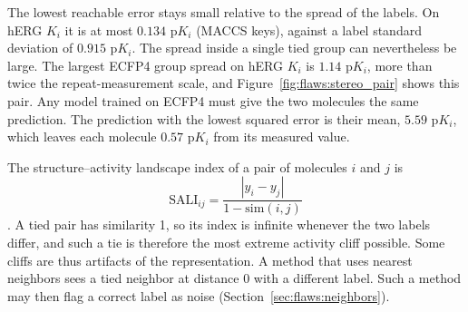 The lowest reachable error stays small relative to the spread of the labels. On hERG $K_i$ it is at most $0.134$ p$K_i$ (MACCS keys), against a label standard deviation of $0.915$ p$K_i$. The spread inside a single tied group can nevertheless be large. The largest ECFP4 group spread on hERG $K_i$ is $1.14$ p$K_i$, more than twice the repeat-measurement scale, and Figure~\ref{fig:flaws:stereo_pair} shows this pair. Any model trained on ECFP4 must give the two molecules the same prediction. The prediction with the lowest squared error is their mean, $5.59$ p$K_i$, which leaves each molecule $0.57$ p$K_i$ from its measured value.

The structure--activity landscape index of a pair of molecules $i$ and $j$ is
\begin{equation}
\mathrm{SALI}_{ij} = \frac{|y_i - y_j|}{1 - \mathrm{sim}(i,j)}
\end{equation}
\citep{Guha2008}. A tied pair has similarity 1, so its index is infinite whenever the two labels differ, and such a tie is therefore the most extreme activity cliff possible. Some cliffs are thus artifacts of the representation. A method that uses nearest neighbors sees a tied neighbor at distance 0 with a different label. %
Such a method may then flag a correct label as noise (Section~\ref{sec:flaws:neighbors}).

